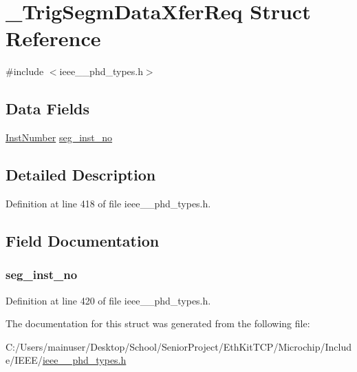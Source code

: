 \hypertarget{struct___trig_segm_data_xfer_req}{}\section{\+\_\+\+Trig\+Segm\+Data\+Xfer\+Req Struct Reference}
\label{struct___trig_segm_data_xfer_req}


{\ttfamily \#include $<$ieee\+\_\+\_\+phd\+\_\+types.\+h$>$}

\subsection*{Data Fields}
\begin{DoxyCompactItemize}
\item 
\hyperlink{ieee__11073__phd__types_8h_ab78fcfd5f6e61b2c8de677df291cc4d7}{Inst\+Number} \hyperlink{struct___trig_segm_data_xfer_req_adf7e08dd5bd0cc5b6bdd34f692c64f24}{seg\+\_\+inst\+\_\+no}
\end{DoxyCompactItemize}


\subsection{Detailed Description}


Definition at line 418 of file ieee\+\_\+\_\+phd\+\_\+types.\+h.



\subsection{Field Documentation}
\hypertarget{struct___trig_segm_data_xfer_req_adf7e08dd5bd0cc5b6bdd34f692c64f24}{}
\subsubsection[{seg\+\_\+inst\+\_\+no}]{ seg\+\_\+inst\+\_\+no}\label{struct___trig_segm_data_xfer_req_adf7e08dd5bd0cc5b6bdd34f692c64f24}


Definition at line 420 of file ieee\+\_\+\_\+phd\+\_\+types.\+h.



The documentation for this struct was generated from the following file\+:\begin{DoxyCompactItemize}
\item 
C\+:/\+Users/mainuser/\+Desktop/\+School/\+Senior\+Project/\+Eth\+Kit\+T\+C\+P/\+Microchip/\+Include/\+I\+E\+E\+E/\hyperlink{ieee__11073__phd__types_8h}{ieee\+\_\+\_\+phd\+\_\+types.\+h}\end{DoxyCompactItemize}
